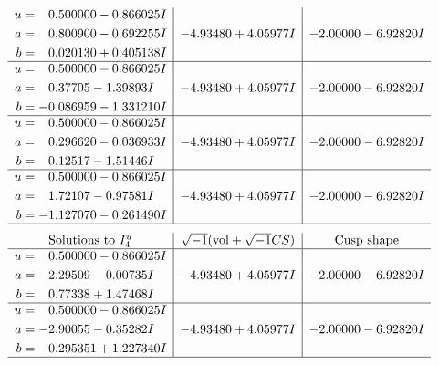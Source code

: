 \documentclass[1p]{elsarticle_modified}
\theoremstyle{definition}
\newcommand{\I}{\sqrt{-1}}
\begin{document}
$$\begin{array}{c|c|c}
\begin{aligned}
u &= \phantom{-}0.500000 - 0.866025 I \\
a &= \phantom{-}0.800900 - 0.692255 I \\
b &= \phantom{-}0.020130 + 0.405138 I\end{aligned}
 & -4.93480 + 4.05977 I & -2.00000 - 6.92820 I \\ \hline\begin{aligned}
u &= \phantom{-}0.500000 - 0.866025 I \\
a &= \phantom{-}0.37705 - 1.39893 I \\
b &= -0.086959 - 1.331210 I\end{aligned}
 & -4.93480 + 4.05977 I & -2.00000 - 6.92820 I \\ \hline\begin{aligned}
u &= \phantom{-}0.500000 - 0.866025 I \\
a &= \phantom{-}0.296620 - 0.036933 I \\
b &= \phantom{-}0.12517 - 1.51446 I\end{aligned}
 & -4.93480 + 4.05977 I & -2.00000 - 6.92820 I \\ \hline\begin{aligned}
u &= \phantom{-}0.500000 - 0.866025 I \\
a &= \phantom{-}1.72107 - 0.97581 I \\
b &= -1.127070 - 0.261490 I\end{aligned}
 & -4.93480 + 4.05977 I & -2.00000 - 6.92820 I\\
 \hline 
 \end{array}$$\newpage$$\begin{array}{c|c|c}  
\text{Solutions to }I^u_{4}& \I (\text{vol} + \sqrt{-1}CS) & \text{Cusp shape}\\
 \hline 
\begin{aligned}
u &= \phantom{-}0.500000 - 0.866025 I \\
a &= -2.29509 - 0.00735 I \\
b &= \phantom{-}0.77338 + 1.47468 I\end{aligned}
 & -4.93480 + 4.05977 I & -2.00000 - 6.92820 I \\ \hline\begin{aligned}
u &= \phantom{-}0.500000 - 0.866025 I \\
a &= -2.90055 - 0.35282 I \\
b &= \phantom{-}0.295351 + 1.227340 I\end{aligned}
 & -4.93480 + 4.05977 I & -2.00000 - 6.92820 I\\
 \hline 
 \end{array}$$\newpage\newpage\renewcommand{\arraystretch}{1}
\end{document}
